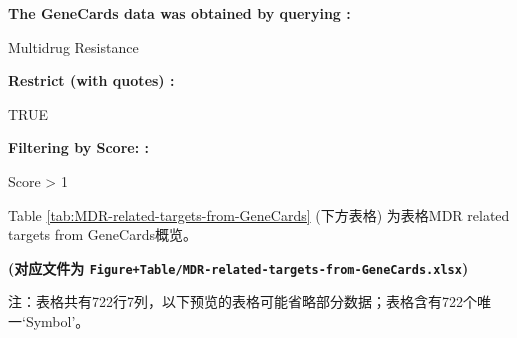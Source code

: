 \documentclass[
]{article}
\begin{document}
\begin{center}\begin{tcolorbox}[colback=gray!10, colframe=gray!50, width=0.9\linewidth, arc=1mm, boxrule=0.5pt]
\textbf{
The GeneCards data was obtained by querying
:}

\vspace{0.5em}

    Multidrug Resistance

\vspace{2em}


\textbf{
Restrict (with quotes)
:}

\vspace{0.5em}

    TRUE

\vspace{2em}


\textbf{
Filtering by Score:
:}

\vspace{0.5em}

    Score > 1

\vspace{2em}
\end{tcolorbox}
\end{center}

Table \ref{tab:MDR-related-targets-from-GeneCards} (下方表格) 为表格MDR related targets from GeneCards概览。

\textbf{(对应文件为 \texttt{Figure+Table/MDR-related-targets-from-GeneCards.xlsx})}

\begin{center}\begin{tcolorbox}[colback=gray!10, colframe=gray!50, width=0.9\linewidth, arc=1mm, boxrule=0.5pt]注：表格共有722行7列，以下预览的表格可能省略部分数据；表格含有722个唯一`Symbol'。
\end{tcolorbox}
\end{center}
\end{document}
